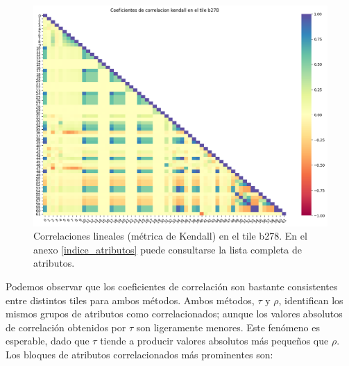 \begin{figure}[h!]
\centering
  \includegraphics[width=1\textwidth]{Kap6/kendall_b278_MATRIX.png}
\caption{ Correlaciones lineales (métrica de Kendall) en el tile b278. En el anexo \protect\ref{indice_atributos} puede consultarse la lista completa de atributos. }
\label{fig:correlation_matrix_b278_ke}
\end{figure}


Podemos observar que los coeficientes de correlación son bastante consistentes entre distintos tiles para ambos métodos. Ambos métodos, $\tau$ y $\rho$, identifican los mismos grupos de atributos como correlacionados; aunque los valores absolutos de correlación obtenidos por $\tau$ son ligeramente menores. Este fenómeno es esperable, dado que $\tau$ tiende a producir valores absolutos más pequeños que $\rho$. \\

Los bloques de atributos correlacionados más prominentes son:

